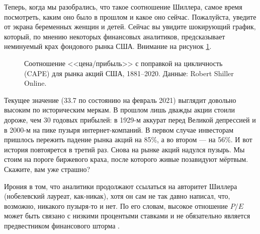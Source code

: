 Теперь, когда мы разобрались, что такое соотношение Шиллера, самое время посмотреть, каким оно было в прошлом и какое оно сейчас. Пожалуйста, уведите от экрана беременных женщин и детей. Сейчас вы увидите шокирующий график, который, по мнению некоторых  финансовых аналитиков, предсказывает неминуемый крах фондового рынка США. Внимание на рисунок \ref{shiller_pe_historical_chart}.

\begin{figure}[ht]
\centering
{}
\caption{Соотношение <<цена/прибыль>> с поправкой на цикличность (CAPE) для рынка акций США, 1881--2020. Данные: Robert Shiller Online.}
\label{shiller_pe_historical_chart}
\end{figure}

Текущее значение (33.7 по состоянию на февраль 2021) выглядит довольно высоким по историческим меркам. В прошлом лишь дважды акции стоили дороже, чем 30 годовых прибылей: в 1929-м аккурат перед Великой депрессией и в 2000-м на пике пузыря интернет-компаний. В первом случае инвесторам пришлось пережить падение рынка акций на 85\%, а во втором --- на 56\%. И вот история повтоярется в третий раз. Снова на рынке акций надулся пузырь. Мы стоим на пороге биржевого краха, после которого живые позавидуют мёртвым. Скажите, вам уже страшно?

Ирония в том, что аналитики продолжают ссылаться на авторитет Шиллера (нобелевский лауреат, как-никак), хотя он сам не так давно написал, что, возможно, никакого пузыря-то и нет. По его словам, высокое отношение $P/E$ может быть связано с низкими процентыми ставками и не обязательно является предвестником финансового шторма \cite{shiller2020cape}.

